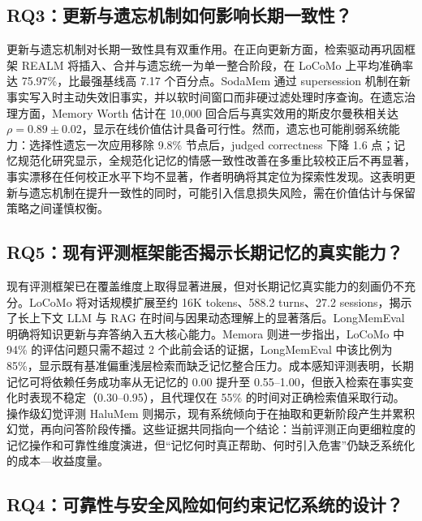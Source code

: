 \subsection{RQ3：更新与遗忘机制如何影响长期一致性？}

更新与遗忘机制对长期一致性具有双重作用。在正向更新方面，检索驱动再巩固框架 REALM 将插入、合并与遗忘统一为单一整合阶段，在 LoCoMo 上平均准确率达 75.97\%，比最强基线高 7.17 个百分点\cite{W0012}。SodaMem 通过 supersession 机制在新事实写入时主动失效旧事实，并以软时间窗口而非硬过滤处理时序查询\cite{W0222}。在遗忘治理方面，Memory Worth 估计在 10,000 回合后与真实效用的斯皮尔曼秩相关达 $\rho=0.89\pm0.02$，显示在线价值估计具备可行性\cite{W0199}。然而，遗忘也可能削弱系统能力：选择性遗忘一次应用移除 9.8\% 节点后，judged correctness 下降 1.6 点\cite{W0034}；记忆规范化研究显示，全规范化记忆的情感一致性改善在多重比较校正后不再显著，事实漂移在任何校正水平下均不显著，作者明确将其定位为探索性发现\cite{W0077}。这表明更新与遗忘机制在提升一致性的同时，可能引入信息损失风险，需在价值估计与保留策略之间谨慎权衡\cite{W0034,W0077,W0199}。

\subsection{RQ5：现有评测框架能否揭示长期记忆的真实能力？}

现有评测框架已在覆盖维度上取得显著进展，但对长期记忆真实能力的刻画仍不充分。LoCoMo 将对话规模扩展至约 16K tokens、588.2 turns、27.2 sessions，揭示了长上下文 LLM 与 RAG 在时间与因果动态理解上的显著落后\cite{W0005}。LongMemEval 明确将知识更新与弃答纳入五大核心能力\cite{W0006}。Memora 则进一步指出，LoCoMo 中 94\% 的评估问题只需不超过 2 个此前会话的证据，LongMemEval 中该比例为 85\%，显示既有基准偏重浅层检索而缺乏记忆整合压力\cite{W0171}。成本感知评测表明，长期记忆可将依赖任务成功率从无记忆的 0.00 提升至 0.55–1.00，但嵌入检索在事实变化时表现不稳定（0.30–0.95），且代理仅在 55\% 的时间对正确检索值采取行动\cite{W0031}。操作级幻觉评测 HaluMem 则揭示，现有系统倾向于在抽取和更新阶段产生并累积幻觉，再向问答阶段传播\cite{W0261}。这些证据共同指向一个结论：当前评测正向更细粒度的记忆操作和可靠性维度演进，但“记忆何时真正帮助、何时引入危害”仍缺乏系统化的成本—收益度量\cite{W0031,W0171,W0261}。

\subsection{RQ4：可靠性与安全风险如何约束记忆系统的设计？}

